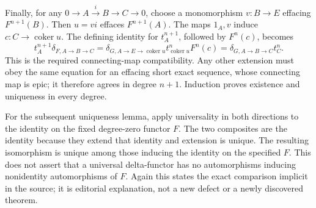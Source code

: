 Finally, for any \(0\to A\xrightarrow{i}B\to C\to0\), choose a monomorphism \(v:B\to E\) effacing \(F^{n+1}(B)\). Then \(u=vi\) effaces \(F^{n+1}(A)\). The maps \(1_A,v\) induce \(c:C\to\operatorname{coker}u\). The defining identity for \(t_A^{n+1}\), followed by \(F^n(c)\), becomes \[
t_A^{n+1}\delta_{F,A\to B\to C}
=\delta_{G,A\to E\to\operatorname{coker}u}
 t_{\operatorname{coker}u}^nF^n(c)
=\delta_{G,A\to B\to C}t_C^n.
\] This is the required connecting-map compatibility. Any other extension must obey the same equation for an effacing short exact sequence, whose connecting map is epic; it therefore agrees in degree \(n+1\). Induction proves existence and uniqueness in every degree.

For the subsequent uniqueness lemma, apply universality in both directions to the identity on the fixed degree-zero functor \(F\). The two composites are the identity because they extend that identity and extension is unique. The resulting isomorphism is unique among those inducing the identity on the specified \(F\). This does not assert that a universal delta-functor has no automorphisms inducing nonidentity automorphisms of \(F\). Again this states the exact comparison implicit in the source; it is editorial explanation, not a new defect or a newly discovered theorem.

